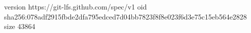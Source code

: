 version https://git-lfs.github.com/spec/v1
oid sha256:078adf2915fbde2dfa795edced7d04bb7823f8f8e023f6d3e75c15eb564e2828
size 43864
